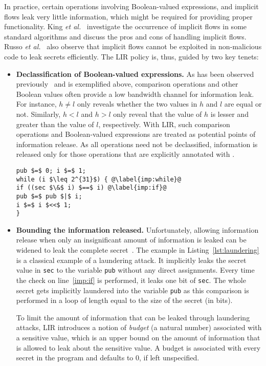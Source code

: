 In practice, certain operations involving Boolean-valued expressions, 
and implicit flows leak very 
little information, which might be required for providing proper
functionality. King \emph{et al.}~ 
investigate the occurrence of implicit flows in some standard 
algorithms and discuss the pros and cons of handling implicit 
flows. Russo \emph{et al.}~ also observe
that implicit flows cannot be exploited in non-malicious code to 
leak secrets efficiently. The LIR policy is, thus, guided by two key tenets: 

\begin{itemize}
\item \textbf{Declassification of Boolean-valued expressions.}  As has been
  observed previously~ and is exemplified
  above, comparison operations and other Boolean values often provide a
  low bandwidth channel for information leak. For
  instance, $h \neq l$ only reveals whether the two values in $h$ and
  $l$ are equal or not. Similarly, $h < l$ and $h > l$ only reveal
  that the value of $h$ is lesser and greater than the value of $l$,
  respectively. With LIR, such comparison operations and Boolean-valued  
  expressions are treated as potential points of information release. 
  As all operations need not be declassified, 
  information is released only for those 
  operations that are explicitly annotated with .

\begin{lstlisting}[float, caption=Laundering attack via implicit flows, label=lst:laundering]
pub $=$ 0; i $=$ 1;
while (i $\leq 2^{31}$) { @\label{imp:while}@
if ((sec $\&$ i) $==$ i) @\label{imp:if}@
pub $=$ pub $|$ i;
i $=$ i $<<$ 1;
}
\end{lstlisting}

\item \textbf{Bounding the information released.} 
  Unfortunately, allowing information release when
  only an insignificant amount of information is leaked can be widened
  to leak the complete secret~. 
  The example in Listing~\ref{lst:laundering} is a classical example 
  of a laundering attack. It implicitly leaks the secret value
  in \texttt{sec} to the variable \texttt{pub} without any direct assignments.
  Every time the check on line~\ref{imp:if} is performed, it leaks one
  bit of \texttt{sec}. The whole secret gets implicitly laundered into
  the variable \texttt{pub} as this comparison is performed in a loop of 
  length equal to the size of the secret (in bits).
  
  To limit the amount of information that can be leaked through 
  laundering attacks, LIR introduces a notion of \emph{budget} (a
  natural number) associated with a sensitive value, which is an
  upper bound on the amount of information that is allowed to leak about
  the sensitive value. A budget is associated with every secret in the
  program and defaults to $0$, if left unspecified. 
\end{itemize}

